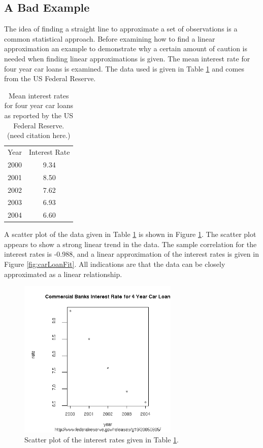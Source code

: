 \documentclass[12pt]{article}
\begin{document}
\fi



\subsection{A Bad Example}

The idea of finding a straight line to approximate a set of
observations is a common statistical approach. Before examining how to
find a linear approximation an example to demonstrate why a certain
amount of caution is needed when finding linear approximations is
given. The mean interest rate for four year car loans is examined. The
data used is given in Table \ref{table:carLoan} and comes from the US
Federal Reserve.

\begin{table}[ht]
  \begin{center}
    \begin{tabular}{rc}
      Year  & Interest Rate \\
      2000 & 9.34 \\
      2001 & 8.50 \\
      2002 & 7.62 \\
      2003 & 6.93 \\
      2004 & 6.60    
    \end{tabular}
  \end{center}
  \caption{Mean interest rates for four year car loans as reported by
    the US Federal Reserve. (need citation here.)}
  \label{table:carLoan}
\end{table}


A scatter plot of the data given in Table \ref{table:carLoan} is shown
in Figure \ref{fig:carLoan}. The scatter plot appears to show a strong
linear trend in the data. The sample correlation for the interest
rates is -0.988, and a linear approximation of the interest rates is
given in Figure \ref{fig:carLoanFit}. All indications are that the
data can be closely approximated as a linear relationship.


\begin{figure}[tb]
    \centerline{\includegraphics[width=3in]{bankRates}}
    \caption{Scatter plot of the interest rates given in Table
      \ref{table:carLoan}.}
  \label{fig:carLoan}
\end{figure}
\end{document}
